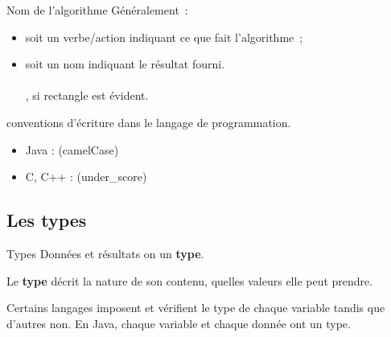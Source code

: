 \begin{hideedit}
\begin{frame}{Nom de l'algorithme}
  Généralement~:
  \begin{itemize}
    \item soit un verbe/action indiquant ce que fait l’algorithme~;\\
      \pause \qquad {}
    \pause
    \item soit un nom indiquant le résultat fourni.\\
      \pause \qquad {}\\
      \pause \qquad {}, si \og rectangle \fg est évident.
  \end{itemize}

  \pause \bcattention conventions d'écriture dans le langage de programmation.
  \begin{itemize}
    \item Java :  (camelCase)
    \item C, C++ :  (under\_score)
  \end{itemize}
\end{frame}

\subsection{Les types}
\begin{frame}{Types}
  Données et résultats on un \textbf{type}.

  Le \textbf{type} décrit la nature de son contenu, quelles valeurs elle
  peut prendre.

  Certains langages imposent et vérifient le type de chaque variable tandis
  que d'autres non. En Java, chaque variable et chaque donnée ont un type.


\end{frame}
\end{hideedit}
